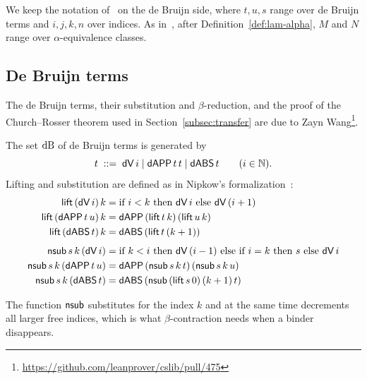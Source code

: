 We keep the notation of~\cite{norrish2007a} on the de Bruijn side,
where $t, u, s$ range over de Bruijn terms and $i, j, k, n$ over
indices. As in~\cite{norrish2007a}, after Definition~\ref{def:lam-alpha},
$M$ and $N$ range over $\alpha$-equivalence classes.

\subsection{De Bruijn terms}
\label{subsec:db-terms}

The de Bruijn terms, their substitution and $\beta$-reduction, and the
proof of the Church--Rosser theorem used in
Section~\ref{subsec:transfer} are due to Zayn
Wang\footnote{\url{https://github.com/leanprover/cslib/pull/475}}.

\begin{definition}
\label{def:db-terms}
The set $\mathrm{dB}$ of de Bruijn terms is generated by
\[
  t \;::=\; \mathsf{dV}\, i \mid \mathsf{dAPP}\, t\, t \mid \mathsf{dABS}\, t
  \qquad (i \in \mathbb{N}).
\]
Lifting
and substitution
are defined as in Nipkow's formalization~\cite{nipkow2001a}:
\begin{align*}
  \mathsf{lift}\, (\mathsf{dV}\, i)\, k &=
    \text{if } i < k \text{ then } \mathsf{dV}\, i \text{ else } \mathsf{dV}\, (i + 1)\\
  \mathsf{lift}\, (\mathsf{dAPP}\, t\, u)\, k &= \mathsf{dAPP}\, (\mathsf{lift}\, t\, k)\, (\mathsf{lift}\, u\, k)\\
  \mathsf{lift}\, (\mathsf{dABS}\, t)\, k &= \mathsf{dABS}\, (\mathsf{lift}\, t\, (k + 1))\\[1ex]
  \mathsf{nsub}\, s\, k\, (\mathsf{dV}\, i) &=
    \text{if } k < i \text{ then } \mathsf{dV}\, (i - 1)
    \text{ else if } i = k \text{ then } s \text{ else } \mathsf{dV}\, i\\
  \mathsf{nsub}\, s\, k\, (\mathsf{dAPP}\, t\, u) &= \mathsf{dAPP}\, (\mathsf{nsub}\, s\, k\, t)\, (\mathsf{nsub}\, s\, k\, u)\\
  \mathsf{nsub}\, s\, k\, (\mathsf{dABS}\, t) &= \mathsf{dABS}\, (\mathsf{nsub}\, (\mathsf{lift}\, s\, 0)\, (k + 1)\, t)
\end{align*}
\end{definition}

The function $\mathsf{nsub}$ substitutes for the index $k$ and at the same
time decrements all larger free indices, which is what
$\beta$-contraction needs when a binder disappears.

